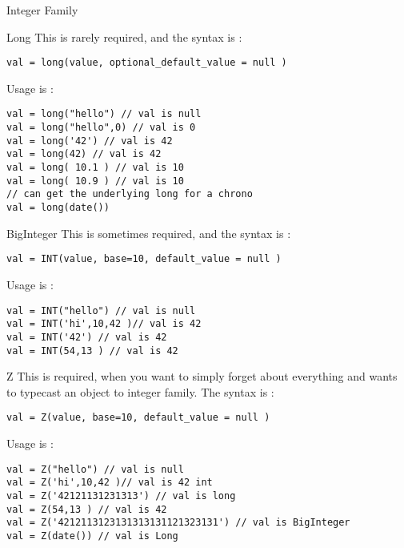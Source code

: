\begin{section}{Integer Family}
\begin{subsection}{Long}
This is rarely required, and the syntax is :

\begin{lstlisting}[style=JexlStyle]
val = long(value, optional_default_value = null )
\end{lstlisting}

Usage is :

\begin{lstlisting}[style=JexlStyle]
val = long("hello") // val is null
val = long("hello",0) // val is 0
val = long('42') // val is 42 
val = long(42) // val is 42 
val = long( 10.1 ) // val is 10 
val = long( 10.9 ) // val is 10 
// can get the underlying long for a chrono 
val = long(date())
\end{lstlisting}

\end{subsection}

\begin{subsection}{BigInteger}
This is sometimes required, and the syntax is :

\begin{lstlisting}[style=JexlStyle]
val = INT(value, base=10, default_value = null )
\end{lstlisting}
Usage is :

\begin{lstlisting}[style=JexlStyle]
val = INT("hello") // val is null
val = INT('hi',10,42 )// val is 42
val = INT('42') // val is 42 
val = INT(54,13 ) // val is 42 
\end{lstlisting}
\end{subsection}

\begin{subsection}{Z}
This is required, when you want to simply
forget about everything and wants to typecast
an object to integer family. 
The syntax is :

\begin{lstlisting}[style=JexlStyle]
val = Z(value, base=10, default_value = null )
\end{lstlisting}

Usage is :

\begin{center}\begin{minipage}{\linewidth}
\begin{lstlisting}[style=JexlStyle]
val = Z("hello") // val is null
val = Z('hi',10,42 )// val is 42 int
val = Z('42121131231313') // val is long 
val = Z(54,13 ) // val is 42 
val = Z('4212113123131313131121323131') // val is BigInteger 
val = Z(date()) // val is Long
\end{lstlisting}
\end{minipage}\end{center}

\end{subsection}


\end{section}


